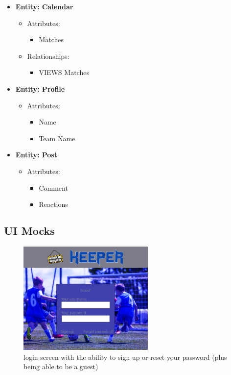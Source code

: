 \documentclass{article}
\begin{document}
\begin{itemize}
\begin{itemize}
\begin{itemize}
                \end{itemize}
        \end{itemize}
    \item \textbf{Entity: Calendar}
        \begin{itemize}
            \item Attributes:
                \begin{itemize}
                    \item Matches
                \end{itemize}
            \item Relationships:
                \begin{itemize}
                    \item VIEWS Matches
                \end{itemize}
        \end{itemize}
    \item \textbf{Entity: Profile}
        \begin{itemize}
            \item Attributes:
                \begin{itemize}
                    \item Name
                    \item Team Name
                \end{itemize}
        \end{itemize}
    \item \textbf{Entity: Post}
        \begin{itemize}
            \item Attributes:
                \begin{itemize}
                    \item Comment
                    \item Reactions
                \end{itemize}
        \end{itemize}
\end{itemize}

\subsection{UI Mocks}
\begin{figure}[h]
    \centering
    \includegraphics[width=0.6\textwidth]{images/Loginscreen .png}
    \caption{login screen with the ability to sign up or reset your password (plus being able to be a guest)}
\end{figure}
\end{document}
